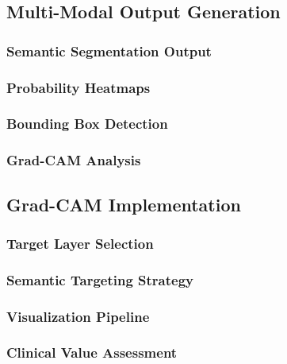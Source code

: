 \documentclass[12pt,a4paper]{report}
\begin{document}
\subsection{Multi-Modal Output Generation}

\subsubsection{Semantic Segmentation Output}

\subsubsection{Probability Heatmaps}

\subsubsection{Bounding Box Detection}

\subsubsection{Grad-CAM Analysis}

\subsection{Grad-CAM Implementation}

\subsubsection{Target Layer Selection}

\subsubsection{Semantic Targeting Strategy}

\subsubsection{Visualization Pipeline}

\subsubsection{Clinical Value Assessment}
\end{document}
